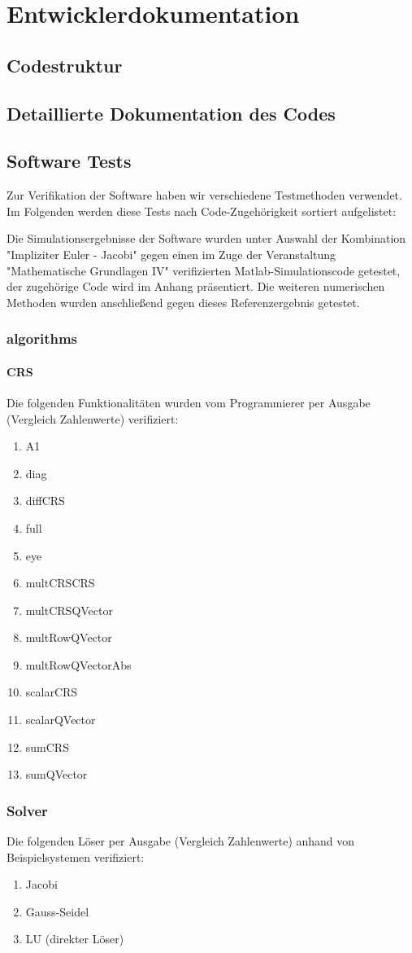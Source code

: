 \chapter{Entwicklerdokumentation}
\section{Codestruktur}

\section{Detaillierte Dokumentation des Codes}

\section{Software Tests}

Zur Verifikation der Software haben wir verschiedene Testmethoden verwendet. Im Folgenden werden diese Tests nach Code-Zugehörigkeit sortiert aufgelistet:

Die Simulationsergebnisse der Software wurden unter Auswahl der Kombination "Impliziter Euler - Jacobi" gegen einen im Zuge der Veranstaltung "Mathematische Grundlagen IV" verifizierten Matlab-Simulationscode getestet, der zugehörige Code wird im Anhang präsentiert. Die weiteren numerischen Methoden wurden anschließend gegen dieses Referenzergebnis getestet.

\subsection{algorithms}
\subsubsection{CRS}

Die folgenden Funktionalitäten wurden vom Programmierer per Ausgabe (Vergleich Zahlenwerte) verifiziert:
\begin{enumerate}
	\item A1
	\item diag
	\item diffCRS
	\item full
	\item eye
	\item multCRSCRS
	\item multCRSQVector
	\item multRowQVector
	\item multRowQVectorAbs
	\item scalarCRS
	\item scalarQVector
	\item sumCRS
	\item sumQVector
\end{enumerate}

\subsection{Solver}

Die folgenden Löser per Ausgabe (Vergleich Zahlenwerte) anhand von Beispielsystemen verifiziert:
\begin{enumerate}
	\item Jacobi
	\item Gauss-Seidel
	\item LU (direkter Löser)
\end{enumerate}